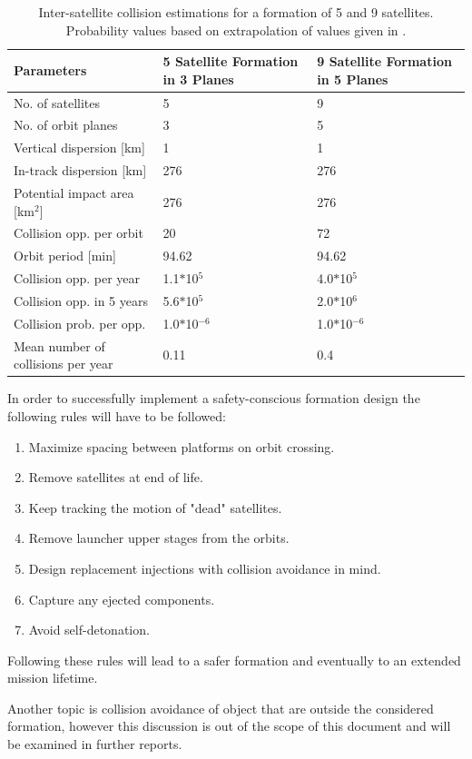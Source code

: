 \begin{table}
	\centering
	
		\begin{tabular}{p{5cm}|p{5cm}|p{5cm}}
	\textbf{Parameters} & \textbf{5 Satellite Formation in 3 Planes} & \textbf{9 Satellite Formation in 5 Planes} \\
		\hline \hline
		No. of satellites & 5 & 9 \\
		No. of orbit planes & 3 & 5 \\ 
		Vertical dispersion [km] & 1 & 1 \\
		In-track dispersion [km] & 276 & 276 \\
		Potential impact area [km$^2$] & 276 & 276 \\ 
		Collision opp. per orbit & 20 & 72 \\
		Orbit period [min] & 94.62 & 94.62 \\ 
		Collision opp. per year & 1.1$*$10$^5$ & 4.0$*$10$^5$ \\
		Collision opp. in 5 years & 5.6$*$10$^5$ & 2.0$*$10$^6$ \\
		Collision prob. per opp. & 1.0$*$10$^{-6}$ & 1.0$*$10$^{-6}$ \\
		Mean number of collisions per year & 0.11 & 0.4
		
			\end{tabular}
	\caption{Inter-satellite collision estimations for a formation of 5 and 9 satellites. Probability values based on extrapolation of values given in \cite{constDesign}.}
	\label{table:coll}
\end{table}

In order to successfully implement a safety-conscious formation design the following rules will have to be followed:
 
\begin{enumerate}
	\item Maximize spacing between platforms on orbit crossing.
	\item Remove satellites at end of life.
	\item Keep tracking the motion of "dead" satellites.
	\item Remove launcher upper stages from the orbits.
	\item Design replacement injections with collision avoidance in mind.
	\item Capture any ejected components.
	\item Avoid self-detonation.
\end{enumerate}
 
Following these rules will lead to a safer formation and eventually to an extended mission lifetime.

Another topic is collision avoidance of object that are outside the considered formation, however this discussion is out of the scope of this document and will be examined in further reports.